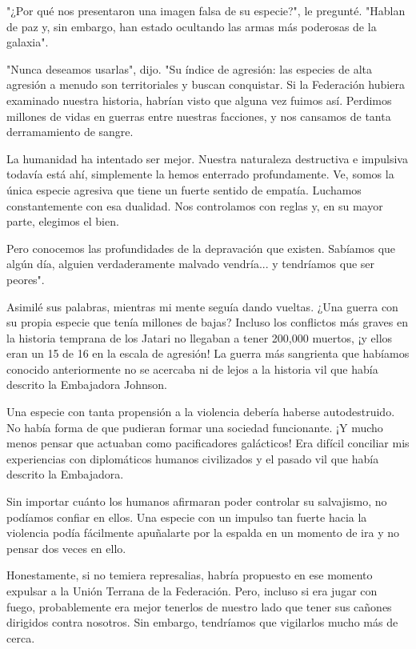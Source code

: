 \documentclass[spanish,12pt,a4paper,oneside,titlepage]{book}
\begin{document}
    "¿Por qué nos presentaron una imagen falsa de su especie?", le pregunté. "Hablan de paz y, sin embargo, han estado ocultando las armas más poderosas de la galaxia".

    "Nunca deseamos usarlas", dijo. "Su índice de agresión: las especies de alta agresión a menudo son territoriales y buscan conquistar. Si la Federación hubiera examinado nuestra historia, habrían visto que alguna vez fuimos así. Perdimos millones de vidas en guerras entre nuestras facciones, y nos cansamos de tanta derramamiento de sangre.

    La humanidad ha intentado ser mejor. Nuestra naturaleza destructiva e impulsiva todavía está ahí, simplemente la hemos enterrado profundamente. Ve, somos la única especie agresiva que tiene un fuerte sentido de empatía. Luchamos constantemente con esa dualidad. Nos controlamos con reglas y, en su mayor parte, elegimos el bien.

    Pero conocemos las profundidades de la depravación que existen. Sabíamos que algún día, alguien verdaderamente malvado vendría... y tendríamos que ser peores".

    Asimilé sus palabras, mientras mi mente seguía dando vueltas. ¿Una guerra con su propia especie que tenía millones de bajas? Incluso los conflictos más graves en la historia temprana de los Jatari no llegaban a tener 200,000 muertos, ¡y ellos eran un 15 de 16 en la escala de agresión! La guerra más sangrienta que habíamos conocido anteriormente no se acercaba ni de lejos a la historia vil que había descrito la Embajadora Johnson.

    Una especie con tanta propensión a la violencia debería haberse autodestruido. No había forma de que pudieran formar una sociedad funcionante. ¡Y mucho menos pensar que actuaban como pacificadores galácticos! Era difícil conciliar mis experiencias con diplomáticos humanos civilizados y el pasado vil que había descrito la Embajadora.

    Sin importar cuánto los humanos afirmaran poder controlar su salvajismo, no podíamos confiar en ellos. Una especie con un impulso tan fuerte hacia la violencia podía fácilmente apuñalarte por la espalda en un momento de ira y no pensar dos veces en ello.

    Honestamente, si no temiera represalias, habría propuesto en ese momento expulsar a la Unión Terrana de la Federación. Pero, incluso si era jugar con fuego, probablemente era mejor tenerlos de nuestro lado que tener sus cañones dirigidos contra nosotros. Sin embargo, tendríamos que vigilarlos mucho más de cerca.
\end{document}
